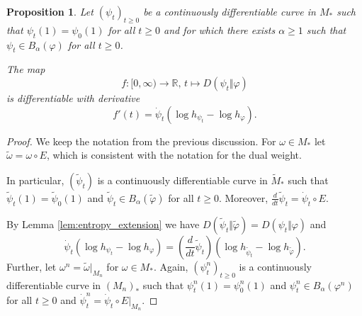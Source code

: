 \documentclass[12pt,a4paper]{amsart}
\newcommand{\1}{\mathds{1}}
\renewcommand{\phi}{\varphi}
\newcommand{\IR}{\mathbb R}
\theoremstyle{plain}
\newtheorem{proposition}{Proposition}[section]
\theoremstyle{definition}
\theoremstyle{remark}
\begin{document}
\begin{proposition}\label{prop:deriv_entropy}
Let $(\psi_t)_{t\geq 0}$ be a continuously differentiable curve in $M_\ast$ such that $\psi_t(1)=\psi_0(1)$ for all $t\geq 0$ and for which there exists $\alpha\geq 1$ such that $\psi_t\in B_\alpha(\phi)$ for all $t\geq 0$.

The map
\begin{equation*}
f\colon [0,\infty)\to \IR,\,t\mapsto D(\psi_t\Vert \phi)
\end{equation*}
is differentiable with derivative
\begin{equation*}
f'(t)=\dot\psi_t(\log h_{\psi_t}-\log h_\phi).
\end{equation*}
\end{proposition}
\begin{proof}
We keep the notation from the previous discussion. For $\omega\in M_\ast$ let $\tilde\omega=\omega\circ E$, which is consistent with the notation for the dual weight.

In particular, $(\tilde \psi_t)$ is a continuously differentiable curve in $\tilde M_\ast$ such that $\tilde \psi_t(1)=\tilde\psi_0(1)$ and $\tilde\psi_t\in B_\alpha(\tilde\phi)$ for all $t\geq 0$. Moreover, $\frac{d}{dt}\tilde\psi_t=\dot\psi_t\circ E$.

By Lemma \ref{lem:entropy_extension} we have $D(\tilde \psi_t\Vert \tilde \phi)=D(\psi_t\Vert \phi)$ and 
\begin{equation*}
\dot\psi_t(\log h_{\psi_t}-\log h_\phi)=\left(\frac{d}{dt}\tilde\psi_t\right)(\log h_{\tilde\psi_t}-\log h_{\tilde\phi}).
\end{equation*}
Further, let $\omega^n=\tilde\omega|_{M_n}$ for $\omega\in M_\ast$. Again, $(\psi^n_t)_{t\geq 0}$ is a continuously differentiable curve in $(M_n)_\ast$ such that $\psi^n_t(1)=\psi^n_0(1)$ and $\psi^n_t\in B_\alpha(\phi^n)$ for all $t\geq 0$ and $\dot\psi^n_t=\dot\psi_t\circ E|_{M_n}$.


\end{proof}
\end{document}
